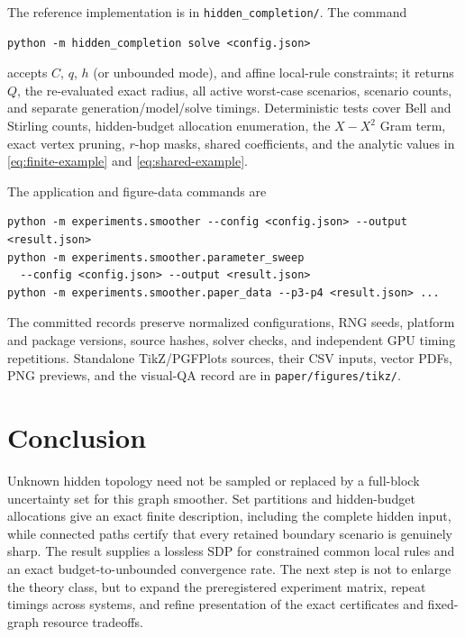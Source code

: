 \documentclass[11pt]{article}
\theoremstyle{definition}
\theoremstyle{remark}
\begin{document}
The reference implementation is in \texttt{hidden\_completion/}.  The command
\begin{verbatim}
python -m hidden_completion solve <config.json>
\end{verbatim}
accepts $C$, $q$, $h$ (or unbounded mode), and affine local-rule constraints;
it returns $Q$, the re-evaluated exact radius, all active worst-case scenarios,
scenario counts, and separate generation/model/solve timings.  Deterministic
tests cover Bell and Stirling counts, hidden-budget allocation enumeration,
the $X-X^2$ Gram term, exact vertex pruning, $r$-hop masks, shared
coefficients, and the analytic values in \eqref{eq:finite-example} and
\eqref{eq:shared-example}.

The application and figure-data commands are
\begin{verbatim}
python -m experiments.smoother --config <config.json> --output <result.json>
python -m experiments.smoother.parameter_sweep
  --config <config.json> --output <result.json>
python -m experiments.smoother.paper_data --p3-p4 <result.json> ...
\end{verbatim}
The committed records preserve normalized configurations, RNG seeds, platform
and package versions, source hashes, solver checks, and independent GPU timing
repetitions.  Standalone TikZ/PGFPlots sources, their CSV inputs, vector PDFs,
PNG previews, and the visual-QA record are in
\texttt{paper/figures/tikz/}.

\section{Conclusion}

Unknown hidden topology need not be sampled or replaced by a full-block
uncertainty set for this graph smoother.  Set partitions and hidden-budget
allocations give an exact finite description, including the complete hidden
input, while connected paths certify that every retained boundary scenario is
genuinely sharp.  The result supplies a lossless SDP for constrained common
local rules and an exact budget-to-unbounded convergence rate.  The next step
is not to enlarge the theory class, but to expand the preregistered experiment
matrix, repeat timings across systems, and refine presentation of the exact
certificates and fixed-graph resource tradeoffs.



\end{document}
